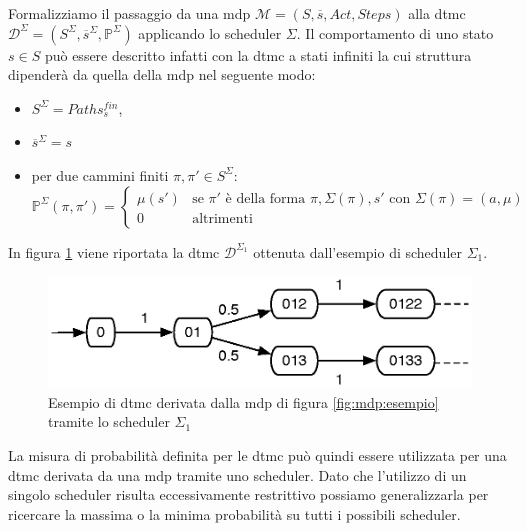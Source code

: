 Formalizziamo il passaggio da una \ac{mdp} $\mathcal{M} = (S,\overline{s},Act,Steps)$ alla \ac{dtmc} $\mathcal{D}^{\Sigma} = (S^\Sigma,\overline{s}^\Sigma,\mathbb{P}^\Sigma) $ applicando lo scheduler $\Sigma$. Il comportamento di uno stato $s \in S$ può essere descritto infatti con la  \ac{dtmc} a stati infiniti la cui struttura dipenderà da quella della \ac{mdp} nel seguente modo:
\begin{itemize}
	\item $S^\Sigma = Paths_s^{fin}$,
	\item $\overline{s}^\Sigma = s$
	\item per due cammini finiti $\pi,\pi' \in S^\Sigma$:
	$$
	\mathbb{P}^\Sigma (\pi,\pi') = \left\{
	\begin{array}{ll}
		\mu(s') & \mbox{se } \pi' \mbox{ è della forma } \pi,\Sigma(\pi),s' \mbox{ con } \Sigma(\pi) = (a,\mu)\\
		0 & \mbox{altrimenti}
	\end{array}
	\right.
	$$
\end{itemize}
In figura \ref{fig:mdp:scheduler} viene riportata la \ac{dtmc} $\mathcal{D}^{\Sigma_1}$ ottenuta dall'esempio di scheduler $\Sigma_1$.
\begin{figure}[htb]
	\begin{center}
		\includegraphics[width=.7\textwidth]{Images/scheduler}
	\end{center}
	\caption{Esempio di \acs{dtmc} derivata dalla \acs{mdp} di figura \ref{fig:mdp:esempio} tramite lo scheduler $\Sigma_1$}
	\label{fig:mdp:scheduler}
\end{figure}
La misura di probabilità definita per le \ac{dtmc} può quindi essere utilizzata per una \ac{dtmc} derivata da una \ac{mdp} tramite uno scheduler. Dato che l'utilizzo di un singolo scheduler risulta eccessivamente restrittivo possiamo generalizzarla per ricercare la massima o la minima probabilità su tutti i possibili scheduler.

